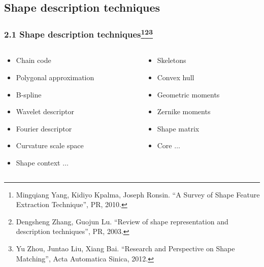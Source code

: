 \documentclass[notheorems,serif,table,compress]{beamer}  %
\begin{document}
\subsection{Shape description techniques}
\begin{frame}
\frametitle{2.1 Shape description techniques\footnote{Mingqiang Yang, Kidiyo Kpalma, Joseph Ronsin. ``A Survey of Shape Feature Extraction Technique'', PR, 2010.}\footnote{Dengsheng Zhang, Guojun Lu. ``Review of shape representation and description techniques'', PR, 2003.}\footnote{Yu Zhou, Juntao Liu, Xiang Bai. ``Research and Perspective on Shape Matching'', Acta Automatica Sinica, 2012.}}
    \begin{columns}
        \begin{column}{0.55\linewidth}
            \begin{itemize}
                \item Chain code
                \item Polygonal approximation
                \item B-spline
                \item Wavelet descriptor
                \item Fourier descriptor
                \item Curvature scale space
                \item Shape context\newline
                $\dots$
                \end{itemize}
        \end{column}
        \begin{column}{0.45\linewidth}
             \begin{itemize}
                \item Skeletons
                \item Convex hull
                \item Geometric moments
                \item Zernike moments
                \item Shape matrix
                \item Core\newline
                $\dots$
            \end{itemize}
        \end{column}
    \end{columns}\vspace{1ex}
\end{frame}
\end{document}
